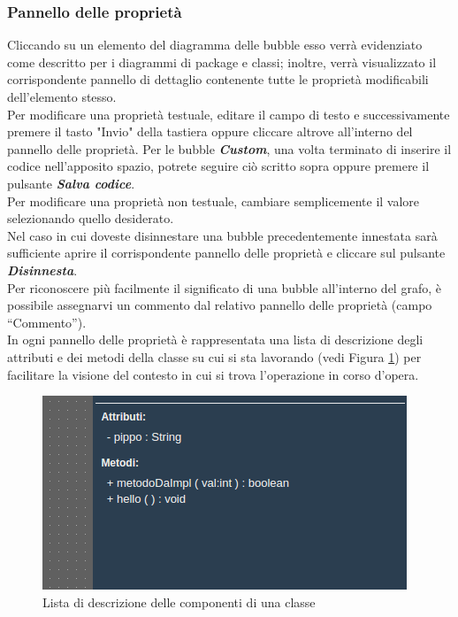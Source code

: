 \documentclass[../ManualeUtente.tex]{subfiles}
\begin{document}
			\subsubsection{Pannello delle proprietà}
				Cliccando su un elemento del diagramma delle bubble esso verrà evidenziato come descritto
				per i diagrammi di package e classi; inoltre, verrà visualizzato il corrispondente pannello
				di dettaglio contenente tutte le proprietà modificabili dell'elemento stesso.\\
				Per modificare una proprietà testuale, editare il campo di testo e successivamente premere il
				tasto "Invio" della tastiera oppure cliccare altrove all'interno del pannello delle proprietà.
				Per le bubble \textit{\textbf{Custom}}, una volta terminato di inserire il codice nell'apposito spazio,
				potrete seguire ciò scritto sopra oppure premere il pulsante \textit{\textbf{Salva codice}}.\\
				Per modificare una proprietà non testuale, cambiare semplicemente il valore selezionando quello
				desiderato.\\
				Nel caso in cui doveste disinnestare una bubble precedentemente innestata sarà sufficiente aprire il
				corrispondente pannello delle proprietà e cliccare sul pulsante \textit{\textbf{Disinnesta}}.\\
				Per riconoscere più facilmente il significato di una bubble all'interno del grafo, è possibile
				assegnarvi un commento dal relativo pannello delle proprietà (campo ``Commento'').\\
				In ogni pannello delle proprietà è rappresentata una lista di descrizione degli attributi e dei
				metodi della classe su cui si sta lavorando (vedi Figura \ref{fig:ClassDesc}) per facilitare la
				visione del contesto in cui si trova l'operazione in corso d'opera.
				\begin{figure} [h!]
					\centering
					\includegraphics[scale=0.4]{./Immagini/ClassDesc.png}
					\caption{Lista di descrizione delle componenti di una classe}\label{fig:ClassDesc}
				\end{figure}
\end{document}
